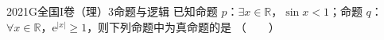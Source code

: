 
\begin{problem}{2021}{G}{全国I卷（理）}{3}{命题与逻辑}
已知命题 $ p $：$ \exists x\in\mathbb{R} $，$ \sin x<1 $；命题 $ q $：$ \forall x\in\mathbb{R} $，$ \mathrm{e}^{\lvert x\rvert}\geq 1 $，则下列命题中为真命题的是 \hspace{1cm}（　　）
\begin{choices}
\end{choices}
\end{problem}

\begin{answer}

\end{answer}

\begin{solutions}

\end{solutions}